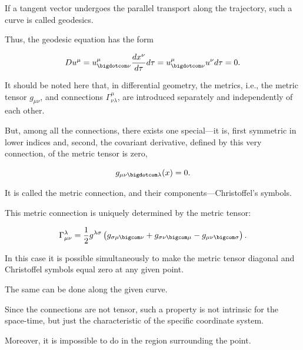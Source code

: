 If a tangent vector undergoes the parallel transport along the trajectory, such a curve is called geodesics. 

Thus, the geodesic equation has the form

\begin{equation}

\label{geo}

Du^{\mu} = u^{\mu}_{\bigdotcom \nu} \frac{dx^{\nu}}{d \tau} d \tau =

u^{\mu}_{\bigdotcom \nu} u^{\nu} d \tau = 0 .

\end{equation}

It should be noted here that, in differential geometry, the metrics, i.e., the metric tensor $g_{\mu \nu}$, and connections $\Gamma ^{\mu}_{\nu \lambda}$, are introduced separately and independently of each other. 

But, among all the connections, there exists one special---it is, first symmetric in lower indices and, second, the covariant derivative, defined by this very connection, of the metric tensor is zero, 

$$

g_{\mu \nu \bigdotcom \lambda} (x) = 0.

$$ 

It is called the metric connection, and their components---Christoffel's  symbols. 

This metric connection is uniquely determined by the metric tensor:

\begin{equation}

\label{Crist}

\Gamma ^{\lambda}_{\mu \nu} = \frac{1}{2} g^{\lambda \sigma}

\left (g_{\sigma \mu \bigcom \nu} + g_{\sigma \nu \bigcom \mu} - g_{\mu \nu \bigcom \sigma} \right ).

\end{equation}

In this case it is possible simultaneously to make the metric tensor diagonal and Christoffel symbols equal zero at any given point. 

The same can be done along the given curve. 

Since the connections are not tensor, such a property is not intrinsic for the space-time, but just the characteristic of the specific coordinate system. 

Moreover, it is impossible to do in the region surrounding the point. 

